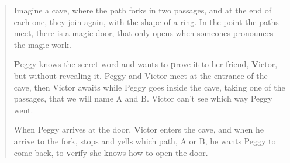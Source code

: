 \begin{quote}
	Imagine a cave, where the path forks in two passages, and at the end of each one, they join again, with the shape of a ring. In the point the paths meet, there is a magic door, that only opens when someones pronounces the magic work.
	
	\textbf{P}eggy knows the secret word and wants to \textbf{p}rove it to her friend, \textbf{V}ictor, but without revealing it.
	Peggy and Victor meet at the entrance of the cave, then Victor awaits while Peggy goes inside the cave, taking one of the passages, that we will name A and B. Victor can't see which way Peggy went. 
	
	When Peggy arrives at the door, \textbf{V}ictor enters the cave, and when he arrive to the fork, stops and yells which path, A or B, he wants Peggy to come back, to \textbf{v}erify she knows how to open the door.
	

\end{quote}
